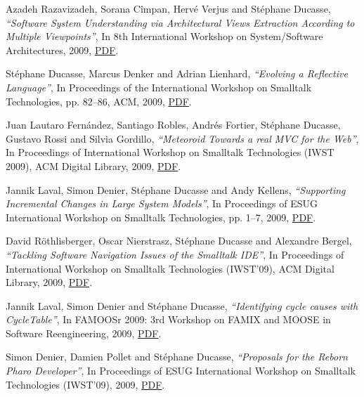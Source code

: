 \documentclass{article}
\newcommand{\czauthors}[1]{#1}
\newcommand{\cztitle}[1]{\emph{``#1''}}
\newcommand{\czbooktitle}[1]{#1}
\begin{document}
\begin{itemize}
	\pub  \czauthors{Azadeh Razavizadeh, Sorana C\^impan, Herv\'e Verjus and St\'ephane Ducasse},  \cztitle{Software System Understanding via Architectural Views Extraction According to Multiple Viewpoints},  In \czbooktitle{8th International Workshop on System/Software Architectures}, 2009, \href{http://rmod-files.lille.inria.fr/Team/Texts/Papers/Raza09b-iwssa-.pdf}{PDF}.

	\pub  \czauthors{St\'ephane Ducasse, Marcus Denker and Adrian Lienhard},  \cztitle{Evolving a Reflective Language},  In \czbooktitle{Proceedings of the International Workshop on Smalltalk Technologies}, pp. 82--86, ACM, 2009, \href{http://rmod-files.lille.inria.fr/Team/Texts/Papers/Duca09b-IWST09-TraitMop.pdf}{PDF}.

	\pub  \czauthors{Juan Lautaro Fern\'andez, Santiago Robles, Andr\'es Fortier, St\'ephane Ducasse, Gustavo Rossi and Silvia Gordillo},  \cztitle{Meteoroid Towards a real MVC for the Web},  In \czbooktitle{Proceedings of International Workshop on Smalltalk Technologies (IWST 2009)}, ACM Digital Library, 2009, \href{http://rmod-files.lille.inria.fr/Team/Texts/Papers/Laut09a-IWST09-Meteroid.pdf}{PDF}.

	\pub  \czauthors{Jannik Laval, Simon Denier, St\'ephane Ducasse and Andy Kellens},  \cztitle{Supporting Incremental Changes in Large System Models},  In \czbooktitle{Proceedings of ESUG International Workshop on Smalltalk Technologies}, pp. 1--7, 2009, \href{http://rmod-files.lille.inria.fr/Team/Texts/Papers/Lava09b-IWST09-incrementalChange.pdf}{PDF}.

	\pub  \czauthors{David R\"{o}thlisberger, Oscar Nierstrasz, St\'ephane Ducasse and Alexandre Bergel},  \cztitle{Tackling Software Navigation Issues of the Smalltalk IDE},  In \czbooktitle{Proceedings of International Workshop on Smalltalk Technologies (IWST'09)}, ACM Digital Library, 2009, \href{http://rmod-files.lille.inria.fr/Team/Texts/Papers/Roet09e-IWST2009-obEnhancements.pdf}{PDF}.

	\pub  \czauthors{Jannik Laval, Simon Denier and St\'ephane Ducasse},  \cztitle{Identifying cycle causes with CycleTable},  In \czbooktitle{FAMOOSr 2009: 3rd Workshop on FAMIX and MOOSE in Software Reengineering}, 2009, \href{http://rmod-files.lille.inria.fr/Team/Texts/Papers/Lava09d-Famoosr2009-CycleTable.pdf}{PDF}.

	\pub  \czauthors{Simon Denier, Damien Pollet and St\'ephane Ducasse},  \cztitle{Proposals for the Reborn Pharo Developer},  In \czbooktitle{Proceedings of ESUG International Workshop on Smalltalk Technologies (IWST'09)}, 2009, \href{http://rmod-files.lille.inria.fr/Team/Texts/Papers/Deni09b-IWST09-PharoBrowsers.pdf}{PDF}.


\end{itemize}
\end{document}
